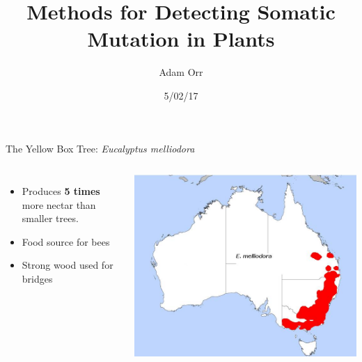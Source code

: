 \documentclass{beamer}
\title[Detecting Somatic Mutations]{Methods for Detecting Somatic Mutation in Plants}
\date{5/02/17}
\author{Adam Orr}
\begin{document}
\frame{\titlepage}
\begin{frame}{The Yellow Box Tree: \textit{Eucalyptus melliodora}}

\begin{columns}
\begin{itemize}
\item Produces \textbf{5 times} more nectar than smaller trees.
\item Food source for bees
\item Strong wood used for bridges
\end{itemize}
\includegraphics[width=\linewidth]{map.jpg}\footnotemark
\end{columns}
\end{frame}
\end{document}
